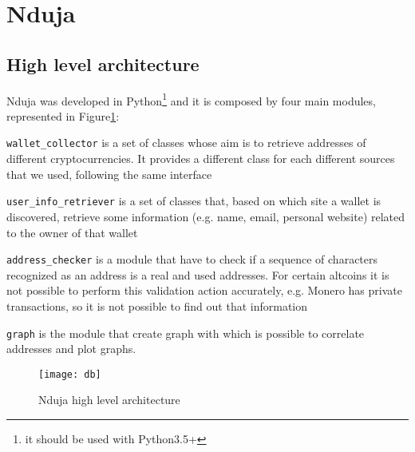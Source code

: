 \newcommand{\walletcollector}{\texttt{wallet\_collector}}
\newcommand{\userinforetriever}{\texttt{user\_info\_retriever}}
\newcommand{\addresschecker}{\texttt{address\_checker}}
\newcommand{\graph}{\texttt{graph}}

\section{Nduja}
\subsection{High level architecture}
Nduja was developed in Python\footnote{it should be used with Python3.5+} and it
is composed by four main modules, represented in Figure\ref{fig:architecture}:
\begin{enumerate*}[label=\roman*),itemjoin={,\quad}]
\item \walletcollector{} is a set of classes whose aim is to retrieve
addresses of different cryptocurrencies. It provides a different class for each
different sources that we used, following the same interface
\item \userinforetriever{} is a set of classes that, based on which
site a wallet is discovered, retrieve some information (e.g. name, email,
personal website) related to the owner of that wallet
\item \addresschecker{} is a module that have to check if a sequence of
characters recognized as an address is a real and used addresses. For certain
altcoins it is not possible to perform this validation action accurately, e.g.
Monero has private transactions, so it is not possible to find out that
information
\item \graph{} is the module that create graph with which is possible to
correlate addresses and plot graphs.
\end{enumerate*}

\begin{figure}[H]
\centering
\texttt{[image: db]}
\caption{Nduja high level architecture}
\label{fig:architecture}
\end{figure}

